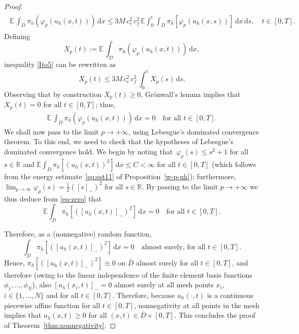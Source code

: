 \documentclass[12pt]{article}
\newcommand{\dd}{\,\mathrm{d}}
\begin{document}
{\begin{proof}
%
\begin{align}
\begin{aligned}\label{Ito5}
\mathbb{E}\, \int_D \pi_h (\varphi_p(u_h(x,t)))\dd x\leq 3 M\,c_e^2\, c_f^2 \,\mathbb{E}
\int_0^t \int_D \pi_h[\varphi_p(u_h(x,s))]\dd x \dd s,\quad t \in [0,T].
\end{aligned}
\end{align}
Defining 
%
\[X_p(t):= \mathbb{E}\, \int_D \pi_h (\varphi_p(u_h(x,t)))\dd x,\] 
inequality \eqref{Ito5} can be rewritten as
%
\[X_p(t)\leq 3 M\,c_e^2\, c_f^2 \, \int_0^t X_p(s)\dd s.\]
%
Observing that by construction $X_p(t)\geq 0$, Gr\"onwall's lemma implies that $X_p(t)=0$ for all $t \in [0,T]$; thus,
%
\begin{align}\label{eq-zero}
\mathbb{E}\, \int_D \pi_h (\varphi_p(u_h(x,t)))\dd x = 0\quad \mbox{for all $t \in [0,T]$}.
\end{align}
%
We shall now pass to the limit $p \rightarrow +\infty$, using Lebesgue's dominated convergence theorem. To this end, we need to check that the hypotheses of Lebesgue's dominated convergence hold.  
We begin by noting that~$\varphi_p(s) \leq s^2 +1$ for all $s \in \mathbb{R}$ and $\mathbb{E}\int_D \pi_h[(u_h(x,t))^2] \dd x \leq C < \infty$ for all $t \in [0,T]$ (which follows from the energy estimate~\eqref{eq:est11} of Proposition~\ref{w-p-uh}); 
furthermore, $\lim_{p \rightarrow \infty} \varphi_p(s) = \frac{1}{2}([s]_{-})^2$ for all $s \in \mathbb{R}$. By passing to the limit $p \to +\infty$ we thus deduce from \eqref{eq-zero} that
%
\[ \mathbb{E}\int_D \pi_h[([u_h(x,t)]_{-})^2]\dd x = 0\quad \mbox{for all $t \in [0,T]$}. \]
%

Therefore, as a (nonnegative) random function, 
%
\[ \int_D \pi_h[([u_h(x,t)]_{-})^2]\dd x = 0\quad \mbox{almost surely, for all $t \in [0,T]$}.\]
%
Hence, $\pi_h[([u_h(x,t)]_{-})^2]\equiv 0$ on $\overline{D}$ almost surely for all $t \in [0,T]$, and therefore (owing to the linear independence of the finite element basis functions $\phi_1, \ldots, \phi_N$), also $[u_h(x_i,t)]_{-}=0$ almost surely at all mesh points $x_i$, $i \in \{1,\ldots,N\}$ and for all $t \in [0,T]$. Therefore, because $u_h(\cdot,t)$ is a continuous piecewise affine function for all $t \in [0,T]$, nonnegativity at all points in the mesh implies that $u_h(x,t) \geq 0$ for all $(x,t) \in \overline{D} \times [0,T]$. This concludes the proof of Theorem~\ref{thm:nonnegativity}.
\end{proof}

}
\end{document}
